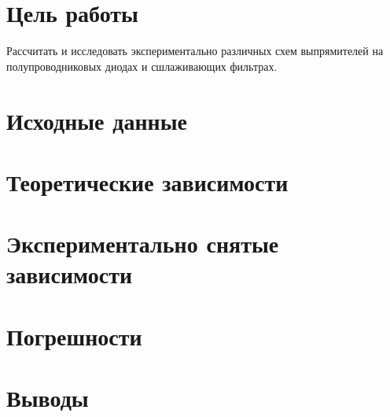 





\section{Цель работы}

Рассчитать и исследовать экспериментально различных схем выпрямителей на полупроводниковых диодах и сшлаживающих фильтрах.

\section{Исходные данные}


\section{Теоретические зависимости}


\section{Экспериментально снятые зависимости}


\section{Погрешности}

  
\section{Выводы}



